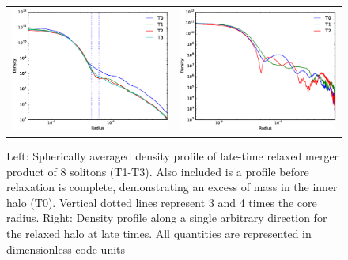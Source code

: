 \documentclass[a4paper,11pt]{article}
\begin{document}
\begin{figure}
\begin{tabular}{cc}
{\includegraphics[scale = 0.42, trim={1.5cm 0 0 1cm}]{pics/M_combined_2.eps}} &
{\includegraphics[scale = 0.42, trim={2.5cm 0 0 1cm}]{pics/M_singles.eps}}
\end{tabular}
\caption{Left: Spherically averaged density profile of late-time relaxed merger product of 8 solitons (T1-T3). Also included is a profile before relaxation is complete, demonstrating an excess of mass in the inner halo (T0). Vertical dotted lines represent 3 and 4 times the core radius.
Right: Density profile along a single arbitrary direction for the relaxed halo at late times. All quantities are represented in dimensionless code units}\label{fig:pul}
\end{figure}
\end{document}
